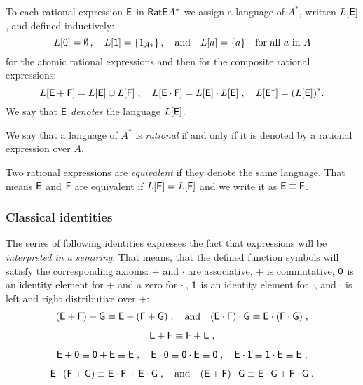 \begin{defn}
    To each rational expression ${\mathsf{E}}$ in ${\mathsf{RatE}} A^*$ we assign a language of $A^*$, written $L[{\mathsf{E}}]$, and defined inductively:
    \[
            L[{\mathsf{0}}] = \emptyset \, , \quad L[{\mathsf{1}}] = \{1_{A*}\} \, , \quad \text{and} \quad L[a] = \{a\} \quad \text{for all $a$ in $A$}
    \]
    for the atomic rational expressions and then for the composite rational expressions:
    \[
        L[{\mathsf{E}} + {\mathsf{F}}] = L[{\mathsf{E}}] \cup L[{\mathsf{F}}] \; , \quad L[{\mathsf{E}} \cdot {\mathsf{F}}] = L[{\mathsf{E}}] \cdot L[{\mathsf{E}}] \; , \quad L[{\mathsf{E}}^*] = {(L[{\mathsf{E}}])}^*.
    \]
    We say that ${\mathsf{E}}$ \emph{denotes} the language $L[{\mathsf{E}}]$.
\end{defn}

We say that a language of $A^*$ is \emph{rational} if and only if it is denoted by a rational expression over $A$.

Two rational expressions are \emph{equivalent} if they denote the same language. That means ${\mathsf{E}}$ and ${\mathsf{F}}$ are equivalent if $L[{\mathsf{E}}] = L[{\mathsf{F}}]$ and we write it as ${\mathsf{E}} \equiv {\mathsf{F}}$.

\subsubsection*{Classical identities}

The series of following identities expresses the fact that expressions will be \emph{interpreted in a semiring}. That means, that the defined function symbols  will satisfy the corresponding axioms: $+$ and $\cdot$ are associative, $+$ is commutative, ${\mathsf{0}}$ is an identity element for $+$ and a zero for $\cdot \:$, ${\mathsf{1}}$ is an identity element for $\cdot$, and $\cdot$ is left and right distributive over $+$:
\begin{gather*}
    ({\mathsf{E}} + {\mathsf{F}}) + {\mathsf{G}} \equiv {\mathsf{E}} + ({\mathsf{F}} + {\mathsf{G}}) \; , \quad \text{and} \quad ({\mathsf{E}} \cdot {\mathsf{F}}) \cdot {\mathsf{G}} \equiv {\mathsf{E}} \cdot ({\mathsf{F}} \cdot {\mathsf{G}}) \; ,\\[1ex]
    {\mathsf{E}} + {\mathsf{F}} \equiv {\mathsf{F}} + {\mathsf{E}} \; ,\\[1ex]
    {\mathsf{E}} + {\mathsf{0}} \equiv {\mathsf{0}} + {\mathsf{E}} \equiv {\mathsf{E}} \; , \quad {\mathsf{E}} \cdot {\mathsf{0}} \equiv {\mathsf{0}} \cdot {\mathsf{E}} \equiv {\mathsf{0}} \; , \quad {\mathsf{E}} \cdot {\mathsf{1}} \equiv {\mathsf{1}} \cdot {\mathsf{E}} \equiv {\mathsf{E}} \; ,\\[1ex]
    {\mathsf{E}} \cdot ({\mathsf{F}} + {\mathsf{G}}) \equiv {\mathsf{E}} \cdot {\mathsf{F}} + {\mathsf{E}} \cdot {\mathsf{G}} \; , \quad \text{and} \quad ({\mathsf{E}} + {\mathsf{F}}) \cdot {\mathsf{G}} \equiv {\mathsf{E}} \cdot {\mathsf{G}} + {\mathsf{F}} \cdot {\mathsf{G}} \; .
\end{gather*}

